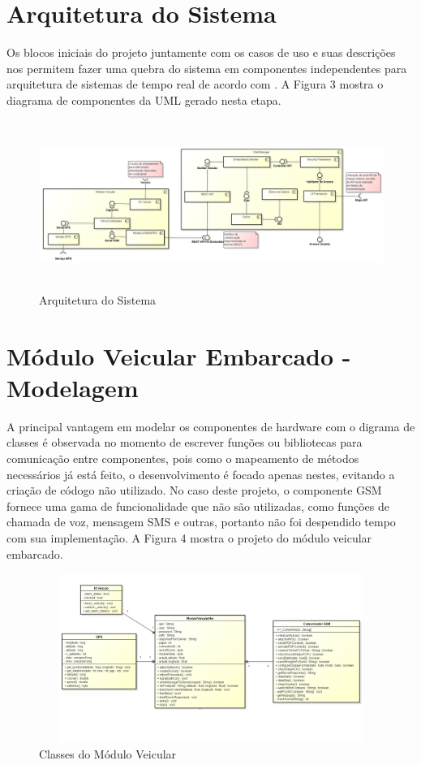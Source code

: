 \section{Arquitetura do Sistema}
Os blocos iniciais do projeto juntamente com os casos de uso e suas descrições nos permitem fazer 
uma quebra do sistema em componentes independentes para arquitetura de sistemas de tempo real de 
acordo com \textcite{Mendes:2002}. A Figura 3 mostra o diagrama de componentes da UML gerado nesta 
etapa.

\begin{figure}[!htb]
\centering
\includegraphics[width=14.00cm,height=5.5cm]{figures/4_arquitetural.png}
\caption{Arquitetura do Sistema}
\label{Figura 3}
\end{figure}


\section{Módulo Veicular Embarcado - Modelagem}
A principal vantagem em modelar os componentes de hardware com o digrama de classes é observada
no momento de escrever funções ou bibliotecas para comunicação entre componentes, pois como o 
mapeamento de métodos necessários já está feito, o desenvolvimento é focado apenas nestes,
evitando a criação de códogo não utilizado. No caso deste projeto, o componente GSM fornece 
uma gama de funcionalidade que não são utilizadas, como funções de chamada de voz, mensagem SMS
e outras, portanto não foi despendido tempo com sua implementação. A Figura 4 mostra o projeto
do módulo veicular embarcado.

\begin{figure}[!htb]
\centering
\includegraphics[width=14.00cm,height=5.5cm]{figures/5_mod_veicular.png}
\caption{Classes do Módulo Veicular}
\label{Figura 4}
\end{figure}

